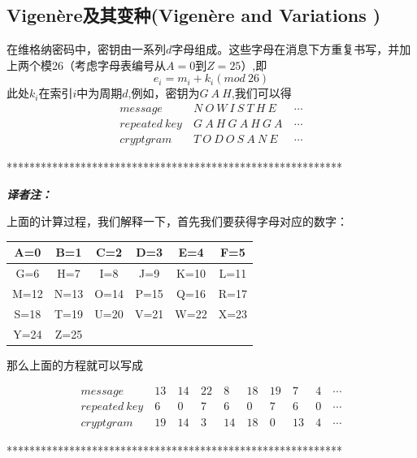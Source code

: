 \documentclass[]{article}
\begin{document}
\subsection{Vigen\`{e}re及其变种(Vigen\`{e}re and Variations )}
在维格纳密码中，密钥由一系列$d$字母组成。这些字母在消息下方重复书写，并加上两个模26（考虑字母表编号从$A=0到Z=25$）,即
\[ e_i = m_i+k_i(mod\ 26) \]
此处$k_i$在索引$i$中为周期$d$,例如，密钥为$G\ A\ H$,我们可以得
\begin{equation}
	\begin{aligned}
	message\ &N\ O\ W\ I\ S\ T\ H\ E\ &\cdots\\
	repeated\ key\ &G\ A\ H\ G\ A\ H\ G\ A\ &\cdots\\
	cryptgram\ &T\ O\ D\ O\ S\ A\ N\ E\ &\cdots\nonumber
	\end{aligned}
\end{equation}

\vspace{1cm}
***********************************************************\par
\textsl{\textbf{译者注：}}\par
上面的计算过程，我们解释一下，首先我们要获得字母对应的数字：\par
\begin{tabular}{|c|c|c|c|c|c|}
	\hline 
	A=0& B=1 & C=2 & D=3 & E=4 & F=5 \\ 
	\hline 
	G=6& H=7 & I=8 & J=9 & K=10 & L=11 \\ 
	\hline 
	M=12& N=13 & O=14 & P=15 & Q=16 & R=17 \\ 
	\hline 
	S=18& T=19 & U=20 & V=21 & W=22 & X=23 \\ 
	\hline 
	Y=24& Z=25 &  &  &  &  \\ 
	\hline 
\end{tabular} 
\par
那么上面的方程就可以写成\par
\begin{equation}
\begin{aligned}
message\ &13\ &14\    &22\ &8\ &18\ &19\ &7\ &4\ &\cdots\\
repeated\ key\ &6\ &0\ &7\ &6\ &0\ &7\   &6\ &0\ &\cdots\\
cryptgram\ &19\ &14\   &3\ &14\ &18\ &0\ &13\ &4\ &\cdots\nonumber
\end{aligned}
\end{equation}

\par
***********************************************************\par
\end{document}
